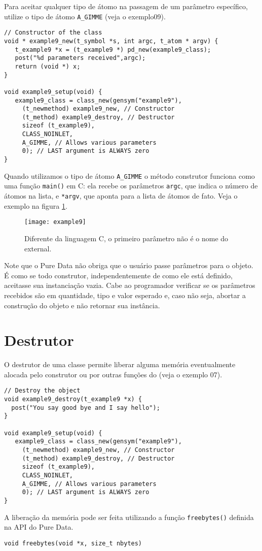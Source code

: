 Para aceitar qualquer tipo de átomo na passagem de um parâmetro específico,
utilize o tipo de átomo \texttt{A\_GIMME} (veja o exemplo09).

\begin{lstlisting}
// Constructor of the class
void * example9_new(t_symbol *s, int argc, t_atom * argv) {
   t_example9 *x = (t_example9 *) pd_new(example9_class);
   post("%d parameters received",argc);
   return (void *) x;
}

void example9_setup(void) {
   example9_class = class_new(gensym("example9"),
     (t_newmethod) example9_new, // Constructor
     (t_method) example9_destroy, // Destructor
     sizeof (t_example9),
     CLASS_NOINLET,
     A_GIMME, // Allows various parameters
     0); // LAST argument is ALWAYS zero
}
\end{lstlisting}

Quando utilizamos o tipo de átomo \texttt{A\_GIMME} o método construtor
funciona como uma função \texttt{main()} em C: ela recebe os parâmetros
\texttt{argc}, que indica o número de átomos na lista, e \texttt{*argv}, que
aponta para a lista de átomos de fato. Veja o exemplo na figura
\ref{fig:construtor-parametros}.

\begin{figure}[h!]
\centering
\texttt{[image: example9]}
\caption{Diferente da linguagem C, o primeiro parâmetro não é o nome do external.}
\label{fig:construtor-parametros}
\end{figure}

Note que o Pure Data não obriga que o usuário passe parâmetros para o objeto. É
como se todo construtor, independentemente de como ele está definido, aceitasse
sua instanciação vazia. Cabe ao programador verificar se os parâmetros
recebidos são em quantidade, tipo e valor esperado e, caso não seja, abortar a
construção do objeto e não retornar sua instância.

\section{Destrutor}

O destrutor de uma classe permite liberar alguma memória eventualmente alocada
pelo construtor ou por outras funções do \external (veja o exemplo 07).

\begin{lstlisting}
// Destroy the object
void example9_destroy(t_example9 *x) {
  post("You say good bye and I say hello");
}

void example9_setup(void) {
   example9_class = class_new(gensym("example9"),
     (t_newmethod) example9_new, // Constructor
     (t_method) example9_destroy, // Destructor
     sizeof (t_example9),
     CLASS_NOINLET,
     A_GIMME, // Allows various parameters
     0); // LAST argument is ALWAYS zero
}
\end{lstlisting}

A liberação da memória pode ser feita utilizando a função \texttt{freebytes()}
definida na API do Pure Data.

\begin{lstlisting}
void freebytes(void *x, size_t nbytes)
\end{lstlisting}

